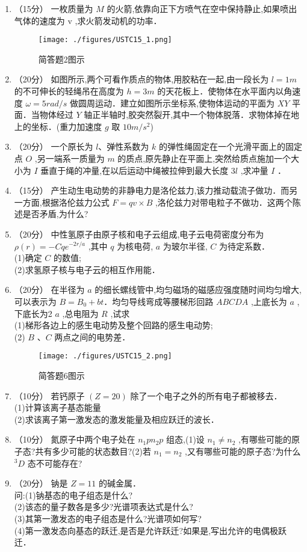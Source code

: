 

\begin{enumerate}
\item （15分）
一枚质量为 $M$ 的火箭,依靠向正下方喷气在空中保持静止,如果喷出气体的速度为  $\mathrm v$ ,求火箭发动机的功率．\\
\begin{figure}[ht]
\centering
\texttt{[image: ./figures/USTC15\_1.png]}
\caption{简答题2图示} \label{USTC15_fig1}
\end{figure}
\item （20分）
如图所示,两个可看作质点的物体,用胶粘在一起,由一段长为 $l=1m$ 的不可伸长的轻绳吊在高度为 $h=3m$ 的天花板上．使物体在水平面内以角速度 $\omega=5rad/s$ 做圆周运动．建立如图所示坐标系,使物体运动的平面为 $XY$ 平面．当物体经过 $Y$ 轴正半轴时,胶突然裂开,其中一个物体脱落．求物体掉在地上的坐标．(重力加速度 $g$ 取 $10m/s^2$)
\item （20分）
一个原长为 $l$、弹性系数为 $k$ 的弹性绳固定在一个光滑平面上的固定点 $O$ ,另一端系一质量为 $m$ 的质点,原先静止在平面上,突然给质点施加一个大小为 $I$ 垂直于绳的冲量,在以后运动中绳被拉伸到最大长度 3$l$ ,求冲量 $I$ ．
\item （15分）
产生动生电动势的非静电力是洛伦兹力,该力推动载流子做功．而另一方面,根据洛伦兹力公式 $F=qv\times B$ ,洛伦兹力对带电粒子不做功．这两个陈述是否矛盾,为什么?
\item （20分）
中性氢原子由原子核和电子云组成,电子云电荷密度分布为 $\rho(r)=-Cqe^{-2r/a}$ ,其中 $q$ 为核电荷, $a$ 为玻尔半径, $C$ 为待定系数．\\
(1)确定 $C$ 的数值;\\
(2)求氢原子核与电子云的相互作用能．
\item （20分）
在半径为 $a$ 的细长螺线管中,均匀磁场的磁感应强度随时间均匀增大,可以表示为 $B=B_0+bt$．均匀导线弯成等腰梯形回路 $ABCDA$ ,上底长为 $a$ ,下底长为2 $a$ ,总电阻为 $R$ ,试求\\
(1)梯形各边上的感生电动势及整个回路的感生电动势;\\
(2) $B$ 、$C$ 两点之间的电势差．\\
\begin{figure}[ht]
\centering
\texttt{[image: ./figures/USTC15\_2.png]}
\caption{简答题6图示} \label{USTC15_fig2}
\end{figure}
\item （10分）
若钙原子 $(Z=20)$ 除了一个电子之外的所有电子都被移去．\\
(1)计算该离子基态能量\\
(2)求该离子第一激发态的激发能量及相应跃迁的波长．
\item （10分）
氮原子中两个电子处在 $n_{1}pn_{2}p$ 组态,(1)设 $n_1\neq n_2$ ,有哪些可能的原子态?共有多少可能的状态数目?(2)若 $n_1=n_2$ ,又有哪些可能的原子态?为什么 $^{3}D$ 态不可能存在?
\item （20分） 
钠是 $Z=11$ 的碱金属．\\问:(1)钠基态的电子组态是什么?\\(2)该态的量子数各是多少?光谱项表达式是什么?\\(3)其第一激发态的电子组态是什么?光谱项如何写?\\(4)第一激发态向基态的跃迁,是否是允许跃迁?如果是,写出允许的电偶极跃迁．
\end{enumerate}